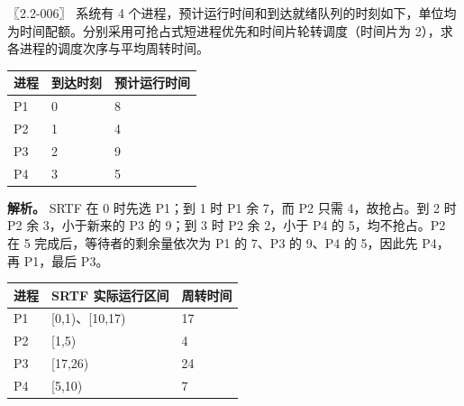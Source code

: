 \begin{example}[配套例题]

〖2.2-006〗 系统有 4 个进程，预计运行时间和到达就绪队列的时刻如下，单位均为时间配额。分别采用可抢占式短进程优先和时间片轮转调度（时间片为 2），求各进程的调度次序与平均周转时间。

\begin{wideblock}

\par\medskip\noindent\begin{minipage}{\linewidth}\fontsize{9.3}{12}\selectfont\begin{tabularx}{\linewidth}{@{}YYY@{}}
\toprule\noalign{}
进程 & 到达时刻 & 预计运行时间 \\
\midrule\noalign{}


P1 & 0 & 8 \\
P2 & 1 & 4 \\
P3 & 2 & 9 \\
P4 & 3 & 5 \\
\bottomrule\end{tabularx}
\end{minipage}\par\medskip

\end{wideblock}

\end{example}

\textbf{解析。} SRTF 在 0 时先选 P1；到 1 时 P1 余 7，而 P2 只需 4，故抢占。到 2 时 P2 余 3，小于新来的 P3 的 9；到 3 时 P2 余 2，小于 P4 的 5，均不抢占。P2 在 5 完成后，等待者的剩余量依次为 P1 的 7、P3 的 9、P4 的 5，因此先 P4，再 P1，最后 P3。

\begin{wideblock}

\par\medskip\noindent\begin{minipage}{\linewidth}\fontsize{9.3}{12}\selectfont\begin{tabularx}{\linewidth}{@{}YYY@{}}
\toprule\noalign{}
进程 & SRTF 实际运行区间 & 周转时间 \\
\midrule\noalign{}


P1 & {[}0,1)、{[}10,17) & 17 \\
P2 & {[}1,5) & 4 \\
P3 & {[}17,26) & 24 \\
P4 & {[}5,10) & 7 \\
\bottomrule\end{tabularx}
\end{minipage}\par\medskip

\end{wideblock}

